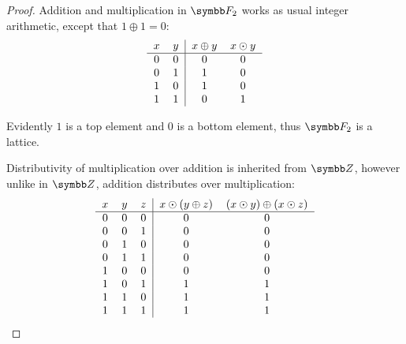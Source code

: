 \begin{proof}
  Addition and multiplication in \( \BF_2 \) works as usual integer arithmetic, except that \( 1 \oplus 1 = 0 \):
  \begin{equation*}
    \begin{tabular}{c c | c c}
      \( x \)    & \( y \)    & \( x \oplus y \) & \( x \odot y \) \\
      \hline
      \( 0 \)    & \( 0 \)    & \( 0 \)          & \( 0 \) \\
      \( 0 \)    & \( 1 \)    & \( 1 \)          & \( 0 \) \\
      \( 1 \)    & \( 0 \)    & \( 1 \)          & \( 0 \) \\
      \( 1 \)    & \( 1 \)    & \( 0 \)          & \( 1 \)
    \end{tabular}
  \end{equation*}

  Evidently \( 1 \) is a top element and \( 0 \) is a bottom element, thus \( \BF_2 \) is a lattice.

  Distributivity of multiplication over addition is inherited from \( \BZ \), however unlike in \( \BZ \), addition distributes over multiplication:
  \begin{equation*}
    \begin{tabular}{c c c | c c}
      \( x \)    & \( y \)    & \( z \)    & \(x \odot (y \oplus z) \) & \( (x \odot y) \oplus (x \odot z) \) \\
      \hline
      \( 0 \)    & \( 0 \)    & \( 0 \)    & \( 0 \)                   & \( 0 \) \\
      \( 0 \)    & \( 0 \)    & \( 1 \)    & \( 0 \)                   & \( 0 \) \\
      \( 0 \)    & \( 1 \)    & \( 0 \)    & \( 0 \)                   & \( 0 \) \\
      \( 0 \)    & \( 1 \)    & \( 1 \)    & \( 0 \)                   & \( 0 \) \\
      \( 1 \)    & \( 0 \)    & \( 0 \)    & \( 0 \)                   & \( 0 \) \\
      \( 1 \)    & \( 0 \)    & \( 1 \)    & \( 1 \)                   & \( 1 \) \\
      \( 1 \)    & \( 1 \)    & \( 0 \)    & \( 1 \)                   & \( 1 \) \\
      \( 1 \)    & \( 1 \)    & \( 1 \)    & \( 1 \)                   & \( 1 \)
    \end{tabular}
  \end{equation*}


\end{proof}

